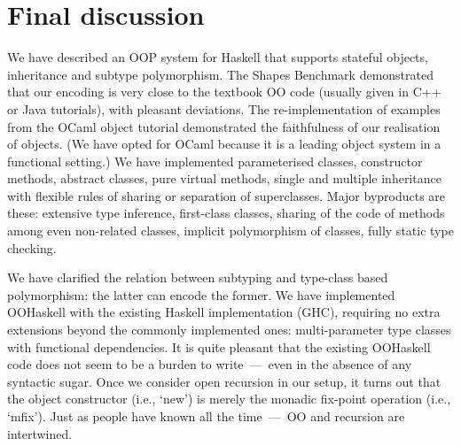 

 
 

 
\section{Final discussion}
\label{S:disc}

We have described an OOP system for Haskell that supports stateful
objects, inheritance and subtype polymorphism. The Shapes Benchmark
demonstrated that our encoding is very close to the textbook OO code
(usually given in C++ or Java tutorials), with pleasant
deviations. The re-implementation of examples from the OCaml object
tutorial demonstrated the faithfulness of our realisation of
objects. (We have opted for OCaml because it is a leading object
system in a functional setting.) We have implemented parameterised
classes, constructor methods, abstract classes, pure virtual methods,
single and multiple inheritance with flexible rules of sharing or
separation of superclasses. Major byproducts are these: extensive type
inference, first-class classes, sharing of the code of methods among
even non-related classes, implicit polymorphism of classes, fully
static type checking.

We have clarified the relation between subtyping and type-class based
polymorphism: the latter can encode the former. We have implemented
OOHaskell with the existing Haskell implementation (GHC), requiring no
extra extensions beyond the commonly implemented ones: multi-parameter
type classes with functional dependencies. It is quite pleasant that
the existing OOHaskell code does not seem to be a burden to
write~---~even in the absence of any syntactic sugar.  Once we
consider open recursion in our setup, it turns out that the object
constructor (i.e., `new') is merely the monadic fix-point operation
(i.e., `mfix'). Just as people have known all the time~---~OO and
recursion are intertwined.

